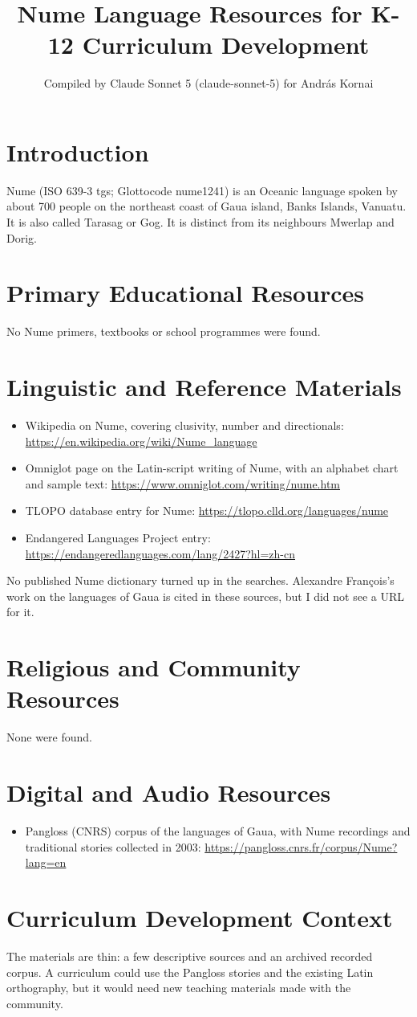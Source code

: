 \documentclass[12pt]{article}
\title{Nume Language Resources for K-12 Curriculum Development}
\author{Compiled by Claude Sonnet 5 (claude-sonnet-5) for Andr\'as Kornai}
\date{}
\begin{document}
\maketitle

\section{Introduction}
Nume (ISO 639-3 tgs; Glottocode nume1241) is an Oceanic language spoken by about 700 people on the northeast coast of Gaua island, Banks Islands, Vanuatu. It is also called Tarasag or Gog. It is distinct from its neighbours Mwerlap and Dorig.

\section{Primary Educational Resources}
No Nume primers, textbooks or school programmes were found.

\section{Linguistic and Reference Materials}
\begin{itemize}
\item Wikipedia on Nume, covering clusivity, number and directionals: \url{https://en.wikipedia.org/wiki/Nume_language}
\item Omniglot page on the Latin-script writing of Nume, with an alphabet chart and sample text: \url{https://www.omniglot.com/writing/nume.htm}
\item TLOPO database entry for Nume: \url{https://tlopo.clld.org/languages/nume}
\item Endangered Languages Project entry: \url{https://endangeredlanguages.com/lang/2427?hl=zh-cn}
\end{itemize}
No published Nume dictionary turned up in the searches. Alexandre Fran\c{c}ois's work on the languages of Gaua is cited in these sources, but I did not see a URL for it.

\section{Religious and Community Resources}
None were found.

\section{Digital and Audio Resources}
\begin{itemize}
\item Pangloss (CNRS) corpus of the languages of Gaua, with Nume recordings and traditional stories collected in 2003: \url{https://pangloss.cnrs.fr/corpus/Nume?lang=en}
\end{itemize}

\section{Curriculum Development Context}
The materials are thin: a few descriptive sources and an archived recorded corpus. A curriculum could use the Pangloss stories and the existing Latin orthography, but it would need new teaching materials made with the community.
\end{document}
